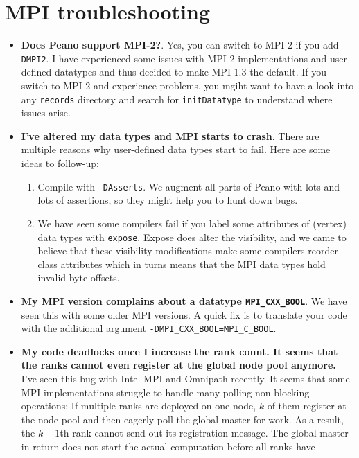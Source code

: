 \section{MPI troubleshooting}

\begin{itemize}
  \item \textbf{ Does Peano support MPI-2?}. Yes, you can switch to MPI-2 if you
  add \texttt{-DMPI2}. I have experienced some issues with MPI-2 implementations and
  user-defined datatypes and thus decided to make MPI 1.3 the default. If you
  switch to MPI-2 and experience problems, you  mgiht want to have a look into
  any \texttt{records} directory and search for \texttt{initDatatype} to
  understand where issues arise.
  \item \textbf{ I've altered my data types and MPI starts to crash}. There are
  multiple reasons why user-defined data types start to fail. Here are some
  ideas to follow-up:
    \begin{enumerate}
      \item Compile with \texttt{-DAsserts}. We augment all parts of Peano with
      lots and lots of assertions, so they might help you to hunt down bugs.
      \item We have seen some compilers fail if you label some attributes of
      (vertex) data types with \texttt{expose}. Expose does alter the
      visibility, and we came to believe that these visibility modifications
      make some compilers reorder class attributes which in turns means that the
      MPI data types hold invalid byte offsets.
    \end{enumerate}
  \item \textbf{ My MPI version complains about a datatype
  \texttt{MPI\_CXX\_BOOL}}.
    We have seen this with some older MPI versions. A quick fix is to translate
    your code with the additional argument
    \texttt{-DMPI\_CXX\_BOOL=MPI\_C\_BOOL}.
  \item \textbf{ My code deadlocks once I increase the rank count. It seems that
    the ranks cannot even register at the global node pool anymore.}
    I've seen this bug with Intel MPI and Omnipath recently. It seems that some
    MPI implementations struggle to handle many polling non-blocking operations:
    If multiple ranks are deployed on one node, $k$ of them register at the node
    pool and then eagerly poll the global master for work. As a result, the
    $k+1$th rank cannot send out its registration message. The global master in
    return does not start the actual computation before all ranks have

\end{itemize}
